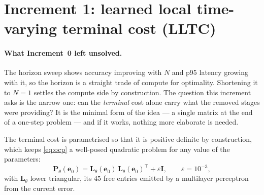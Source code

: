 \documentclass[11pt,a4paper,twoside,openright]{report}
\makeatletter
\renewcommand{\subsection}{\FloatBarrier\old@subsection}}
\newcommand{\transp}{^{\!\top}}
\renewcommand{\vec}[1]{\bm{#1}}
\newcommand{\mat}[1]{\bm{#1}}
\newcommand{\err}{\vec{e}}
\DeclareRobustCommand{\LLTC}{LLTC}
\theoremstyle{plain}
\theoremstyle{definition}
\theoremstyle{remark}
\makeatother
\begin{document}
	\section{Increment 1: learned local time-varying terminal cost (\texorpdfstring{\LLTC}{LLTC})}
	\label{sec:lltc}

	\paragraph{What Increment~0 left unsolved.} The horizon sweep shows accuracy
	improving with $N$ and p95 latency growing with it, so the horizon is a
	straight trade of compute for optimality. Shortening it to $N{=}1$ settles the
	compute side by construction. The question this increment asks is the narrow
	one: can the \emph{terminal} cost alone carry what the removed stages were
	providing? It is the minimal form of the idea --- a single matrix at the end of
	a one-step problem --- and if it works, nothing more elaborate is needed.

	\subsection{Construction}

	The terminal cost is parametrised so that it is positive definite by
	construction, which keeps \cref{eq:ocp} a well-posed quadratic problem for any
	value of the parameters:
	\begin{equation}
		\mat P_\theta(\err_0)=\mat L_\theta(\err_0)\,\mat L_\theta(\err_0)\transp
		+\varepsilon\mat I,
		\qquad \varepsilon=10^{-3},
		\label{eq:lltc}
	\end{equation}
	with $\mat L_\theta$ lower triangular, its $45$ free entries emitted by a
	multilayer perceptron from the current error.
\end{document}
